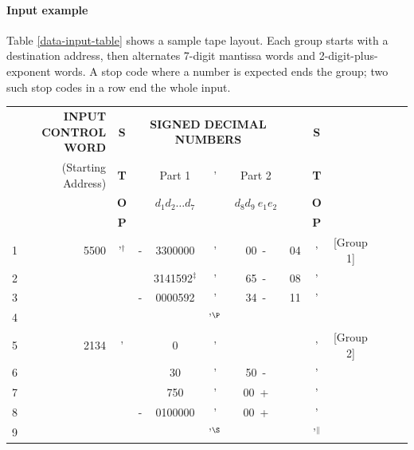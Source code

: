 \paragraph{Input example}
Table \ref{data-input-table} shows a sample tape layout. Each group starts with a destination address, then alternates 7-digit mantissa words and 2-digit-plus-exponent words. A stop code where a number is expected ends the group; two such stop codes in a row end the whole input.

\begin{center}
\small
\ttfamily
\begin{tabular}{crcccccrccrcc}
\toprule
&\textbf{INPUT CONTROL WORD} & \textbf{S} & \multicolumn{4}{c}{\textbf{SIGNED DECIMAL NUMBERS}} &  & \textbf{S} & &\\
&(Starting Address)          & \textbf{T} &   &Part 1&'& Part 2                     &  & \textbf{T} & &\\
&                            & \textbf{O} & &$d_1d_2\dots d_7$ & & $d_8d_9 \ e_1e_2$          &  & \textbf{O} & &\\
&                            & \textbf{P} &                   &                         &     &   &  & \textbf{P} & &\\
\midrule
1&5500                        & '$^{\dagger}$          & - & 3300000           &'& 00~-&04                        & '          & \hfill [Group 1] &\\
2&                            &            &   & 3141592$^{\ddagger}$           &'& 65~-&08                        & '          & &\\
3&                            &            & - & 0000592           &'& 34~-&11                        & '          & &\\
4&							&            &   &                   &'$^{\P}$&                                  &           & &\\
\midrule
5&2134                        & '          &   & \phantom{000000}0 &'&                              &      & '          & \hfill [Group 2] &\\
6&                            &            &   & \phantom{00000}30 &'&50~-&\phantom{00}               & '          & &\\
7&                            &            &   & \phantom{0000}750 &'&00~+&\phantom{00}               & '          & &\\
8&                            &            & - & 0100000           &'&00~+&\phantom{00}               & '          & &\\
9&							&            &   &                   &'$^{\S}$&                                &  &'$^{\parallel}$           & &\\
\bottomrule
\end{tabular}
\vspace{1em}
\label{data-input-table}
\end{center}

